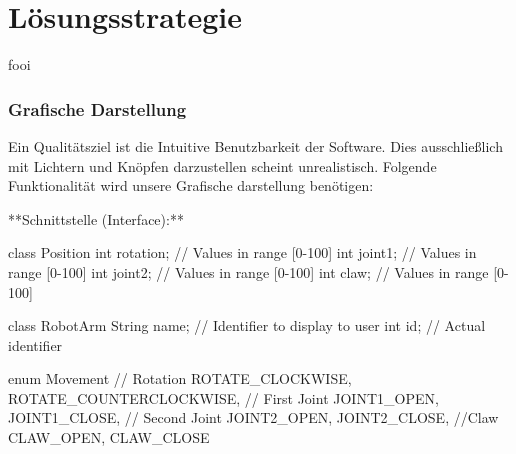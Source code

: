 \chapter{Lösungsstrategie}

fooi

\subsection*{Grafische Darstellung}

Ein Qualitätsziel ist die Intuitive Benutzbarkeit der Software. Dies ausschließlich mit Lichtern und Knöpfen darzustellen scheint unrealistisch. Folgende Funktionalität wird unsere Grafische darstellung benötigen:

**Schnittstelle (Interface):**
\begin{Java}[caption={Utility Types}]
class Position {
	int rotation;   // Values in range [0-100]
	int joint1;     // Values in range [0-100]
	int joint2;     // Values in range [0-100]
	int claw;       // Values in range [0-100]
}

class RobotArm {
	String name;    // Identifier to display to user
	int id;         // Actual identifier 
}

enum Movement {
	// Rotation
	ROTATE_CLOCKWISE,
	ROTATE_COUNTERCLOCKWISE,
	// First Joint
	JOINT1_OPEN,
	JOINT1_CLOSE,
	// Second Joint
	JOINT2_OPEN,
	JOINT2_CLOSE,
	//Claw
	CLAW_OPEN,
	CLAW_CLOSE
}
\end{Java}

\newpage

